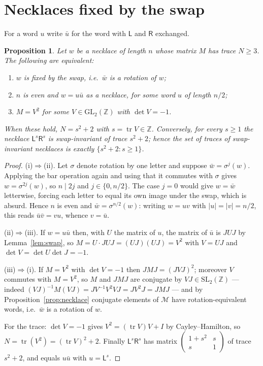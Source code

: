 \documentclass[11pt,reqno]{amsart}
\theoremstyle{plain}
\newtheorem{proposition}[theorem]{Proposition}
\theoremstyle{definition}
\newcommand{\Z}{\mathbb{Z}}
\newcommand{\Ll}{\mathsf{L}}
\newcommand{\Rr}{\mathsf{R}}
\newcommand{\Mon}{\mathcal{M}}
\newcommand{\tr}{\operatorname{tr}}
\newcommand{\SL}{\mathrm{SL}}
\newcommand{\GL}{\mathrm{GL}}
\newcommand{\sqm}[4]{\left(\begin{smallmatrix}#1&#2\\#3&#4\end{smallmatrix}\right)}
\begin{document}
\section{Necklaces fixed by the swap}\label{sec:swapinv}

For a word $u$ write $\bar u$ for the word with $\Ll$ and $\Rr$ exchanged.

\begin{proposition}\label{prop:swapinv}
Let $w$ be a necklace of length $n$ whose matrix $M$ has trace $N\ge3$. The following
are equivalent:
\begin{enumerate}
\item[(i)] $w$ is fixed by the swap, i.e.\ $\bar w$ is a rotation of $w$;
\item[(ii)] $n$ is even and $w=u\bar u$ as a necklace, for some word $u$ of length $n/2$;
\item[(iii)] $M=V^2$ for some $V\in\GL_2(\Z)$ with $\det V=-1$.
\end{enumerate}
When these hold, $N=s^2+2$ with $s=\tr V\in\Z$. Conversely, for every $s\ge1$ the
necklace $\Ll^s\Rr^s$ is swap-invariant of trace $s^2+2$; hence the set of traces of
swap-invariant necklaces is exactly $\{s^2+2:s\ge1\}$.
\end{proposition}

\begin{proof}
(i)$\Rightarrow$(ii). Let $\sigma$ denote rotation by one letter and suppose
$\bar w=\sigma^j(w)$. Applying the bar operation again and using that it commutes with
$\sigma$ gives $w=\sigma^{2j}(w)$, so $n\mid 2j$ and $j\in\{0,n/2\}$. The case $j=0$
would give $w=\bar w$ letterwise, forcing each letter to equal its own image under the
swap, which is absurd. Hence $n$ is even and $\bar w=\sigma^{n/2}(w)$: writing $w=uv$
with $|u|=|v|=n/2$, this reads $\bar u\bar v=vu$, whence $v=\bar u$.

(ii)$\Rightarrow$(iii). If $w=u\bar u$ then, with $U$ the matrix of $u$, the matrix of
$\bar u$ is $JUJ$ by Lemma~\ref{lem:swap}, so
$M=U\cdot JUJ=(UJ)(UJ)=V^2$ with $V=UJ$ and $\det V=\det U\det J=-1$.

(iii)$\Rightarrow$(i). If $M=V^2$ with $\det V=-1$ then $JMJ=(JVJ)^2$; moreover
$V$ commutes with $M=V^2$, so $M$ and $JMJ$ are conjugate by $VJ\in\SL_2(\Z)$ --- indeed
$(VJ)^{-1}M(VJ)=JV^{-1}V^2VJ=JV^2J=JMJ$ --- and by Proposition~\ref{prop:necklace}
conjugate elements of $\Mon$ have rotation-equivalent words, i.e.\ $\bar w$ is a
rotation of $w$.

For the trace: $\det V=-1$ gives $V^2=(\tr V)V+I$ by Cayley--Hamilton, so
$N=\tr(V^2)=(\tr V)^2+2$. Finally $\Ll^s\Rr^s$ has matrix $\sqm{1+s^2}{s}{s}{1}$ of
trace $s^2+2$, and equals $u\bar u$ with $u=\Ll^s$.
\end{proof}
\end{document}
